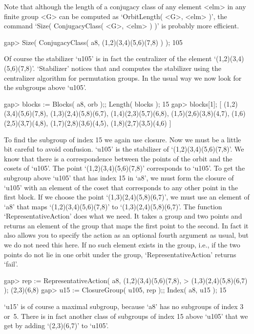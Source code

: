 Note that although the length of a conjugacy class of any element <elm>
in any finite group <G> can be computed as `OrbitLength( <G>, <elm> )',
the command `Size( ConjugacyClass( <G>, <elm> ) )' is probably more
efficient.

\beginexample
gap> Size( ConjugacyClass( a8, (1,2)(3,4)(5,6)(7,8) ) );
105
\endexample

Of course the stabilizer `u105' is in fact the centralizer of the element
`(1,2)(3,4)(5,6)(7,8)'.  `Stabilizer' notices    that and computes    the
stabilizer using the centralizer algorithm for permutation groups. In the
usual way we now look for the subgroups above `u105'.

\beginexample
gap> blocks := Blocks( a8, orb );; Length( blocks );
15
gap> blocks[1];
[ (1,2)(3,4)(5,6)(7,8), (1,3)(2,4)(5,8)(6,7), (1,4)(2,3)(5,7)(6,8), 
  (1,5)(2,6)(3,8)(4,7), (1,6)(2,5)(3,7)(4,8), (1,7)(2,8)(3,6)(4,5), 
  (1,8)(2,7)(3,5)(4,6) ]
\endexample

To find the subgroup of index 15 we  again use closure. Now  we must be a
little bit  careful to avoid    confusion. `u105' is the  stabilizer   of
`(1,2)(3,4)(5,6)(7,8)'. We  know  that there is  a correspondence between
the  points  of  the   orbit and  the   cosets  of  `u105'.   The   point
`(1,2)(3,4)(5,6)(7,8)' corresponds   to `u105'.
To get the subgroup above `u105' that has index 15 in `a8',
we must form the closure of `u105' with an element of the coset that
corresponds to any other point in the first block.
If we choose the point `(1,3)(2,4)(5,8)(6,7)',
we must use an element of `a8' that maps `(1,2)(3,4)(5,6)(7,8)' to
`(1,3)(2,4)(5,8)(6,7)'.
The function `RepresentativeAction' does what we need.
It takes a group and two points and returns an element of the group
that maps the first point to the second.
In fact it also allows you to specify the action as an optional fourth
argument as usual, but we do not need this here.
If no such element exists in the  group, i.e., if the two points do not
lie in one orbit under the group,
`RepresentativeAction' returns `fail'.

\beginexample
gap> rep := RepresentativeAction( a8, (1,2)(3,4)(5,6)(7,8),
>                                        (1,3)(2,4)(5,8)(6,7) );
(2,3)(6,8)
gap> u15 := ClosureGroup( u105, rep );; Index( a8, u15 );
15
\endexample

`u15' is of course a maximal  subgroup, because `a8'  has no subgroups of
index 3 or~5.  There is in fact  another  class of subgroups  of index 15
above `u105' that we get by adding `(2,3)(6,7)' to `u105'.

